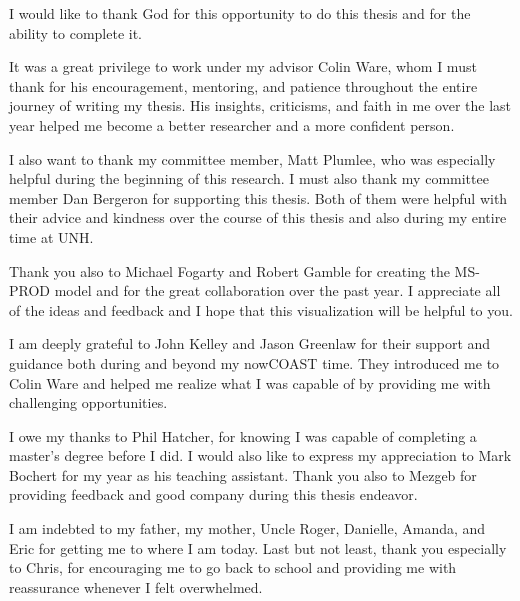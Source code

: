 \documentclass[11pt]{report}
\begin{document}
\begin{acknowledgments}
I would like to thank God for this opportunity to do this thesis and for the ability to complete it.

It was a great privilege to work under my advisor Colin Ware, whom I must thank for his encouragement, mentoring, and patience throughout the entire journey of writing my thesis.  His insights, criticisms, and faith in me over the last year helped me become a better researcher and a more confident person.

I also want to thank my committee member, Matt Plumlee, who was especially helpful during the beginning of this research.  I must also thank my committee member Dan Bergeron for supporting this thesis.  Both of them were helpful with their advice and kindness over the course of this thesis and also during my entire time at UNH.

Thank you also to Michael Fogarty and Robert Gamble for creating the MS-PROD model and for the great collaboration over the past year.  I appreciate all of the ideas and feedback and I hope that this visualization will be helpful to you.

I am deeply grateful to John Kelley and Jason Greenlaw for their support and guidance both during and beyond my nowCOAST time.  They introduced me to Colin Ware and helped me realize what I was capable of by providing me with challenging opportunities.

I owe my thanks to Phil Hatcher, for knowing I was capable of completing a master's degree before I did.  I would also like to express my appreciation to Mark Bochert for my year as his teaching assistant.  Thank you also to Mezgeb for providing feedback and good company during this thesis endeavor.

I am indebted to my father, my mother, Uncle Roger, Danielle, Amanda, and Eric for getting me to where I am today.  Last but not least, thank you especially to Chris, for encouraging me to go back to school and providing me with reassurance whenever I felt overwhelmed.  

\end{acknowledgments}


\tableofcontents					%
\listoffigures						%













\begin{appendices}







\end{appendices}
\end{document}

